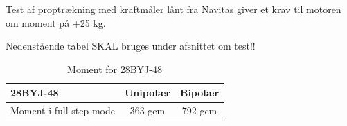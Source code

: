 Test af proptrækning med kraftmåler lånt fra Navitas giver et krav til motoren om moment på +25 kg.

Nedenstående tabel SKAL bruges under afsnittet om test!!
\begin{table}[H]
  	\centering
	\begin{tabular}{ |l|c|c| }
  		\hline
  		\textbf{28BYJ-48} & Unipolær & Bipolær\\
  		\hline
  		Moment i full-step mode & 363 gcm & 792 gcm \\
  		\hline
	\end{tabular}
	\caption[]{Moment for 28BYJ-48\footnotemark}
	\label{tab:motor_moment}
\end{table}
